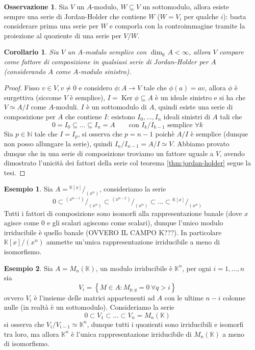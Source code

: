 \documentclass[11pt]{article}
\theoremstyle{plain}
\newtheorem*{cor}{Corollario}
\theoremstyle{definition}
\newtheorem{exmp}{Esempio}[section]
\newtheorem*{rem}{Osservazione}
\theoremstyle{remark}
\newcommand{\K}{\mathbb{K}}
\newcommand{\N}{\mathbb{N}}
\newcommand*\quot[2]{{^{\textstyle #1}\big/_{\textstyle #2}}}
\DeclareMathOperator{\Ker}{Ker}
\DeclareMathOperator{\iso}{\simeq}
\begin{document}
	\begin{rem}
		Sia $V$ un $A$-modulo, $W\subseteq V$ un sottomodulo, allora esiste sempre una serie di Jordan-Holder che contiene $W$ ($W=V_i$ per qualche $i$): basta considerare prima una serie per $W$ e comporla con la controimmagine tramite la proiezione al quoziente di una serie per $V/W$.
	\end{rem}
	\begin{cor}
		Sia $V$ un $A$-modulo semplice con $\dim_{\K}A<\infty$, allora $V$ compare come fattore di composizione in qualsiasi serie di Jordan-Holder per $A$ (considerando $A$ come $A$-modulo sinistro).
	\end{cor}
	\begin{proof}
		Fisso $v\in V, v\neq 0$ e considero $\phi:A\to V$ tale che $\phi(a) = av$, allora $\phi$ è surgettiva (siccome $V$ è semplice), $I=\Ker \phi \subseteq A$ è un ideale sinistro e si ha che $V\iso A/I$ come $A$-moduli. $I$ è un sottomodulo di $A$, quindi esiste una serie di composizione per $A$ che contiene $I$: esistono $I_0,\ldots,I_n$ ideali sinistri di $A$ tali che
		\[
			0=I_0\subseteq\ldots\subseteq I_n = A\qquad \text{con }I_k/I_{k-1}\text{ semplice }\forall k
		\]
		Sia $p\in \N$ tale che $I=I_p$, si osserva che $p=n-1$ poichè $A/I$ è semplice (dunque non posso allungare la serie), quindi $I_n/I_{n-1} = A/I\iso V$. Abbiamo provato dunque che in una serie di composizione troviamo un fattore uguale a $V$, avendo dimostrato l'unicità dei fattori della serie col teorema \ref{thm:jordan-holder} segue la tesi.
	\end{proof}
	\begin{exmp}
		Sia $A=\quot{\K[x]}{(x^n)}$, consideriamo la serie
		\[
			0\subset \quot{(x^{n-1})}{(x^n)}\subset \quot{(x^{n-2})}{(x^n)}\subset \ldots\subset \quot{\K[x]}{(x^n)}
		\]
		Tutti i fattori di composizione sono isomorfi alla rappresentazione banale (dove $x$ agisce come $0$ e gli scalari agiscono come scalari), dunque l'unico modulo irriducibile è quello banale (OVVERO IL CAMPO K???). In particolare $\K[x]/(x^n)$ ammette un'unica rappresentazione irriducibile a meno di isomorfismo.
	\end{exmp}
	\begin{exmp}\label{serie_comp_matrici}
		Sia $A=M_n(\K)$, un modulo irriducibile è $\K^n$, per ogni $i=1,\ldots,n$ sia
		\[
			V_i = \left\{ M\in A : M_{p,q} = 0\ \forall q>i \right\}
		\]
		ovvero $V_i$ è l'insieme delle matrici appartenenti ad $A$ con le ultime $n-i$ colonne nulle (in realtà è un sottomodulo). Consideriamo la serie
		\[
			0\subset V_1\subset\ldots\subset V_n=M_n(\K)
		\]
		si osserva che $V_i/V_{i-1}\iso \K^n$, dunque tutti i quozienti sono irriducibili e isomorfi tra loro, ma allora $\K^n$ è l'unica rappresentazione irriducibile di $M_n(\K)$ a meno di isomorfismo.
	\end{exmp}
\end{document}
